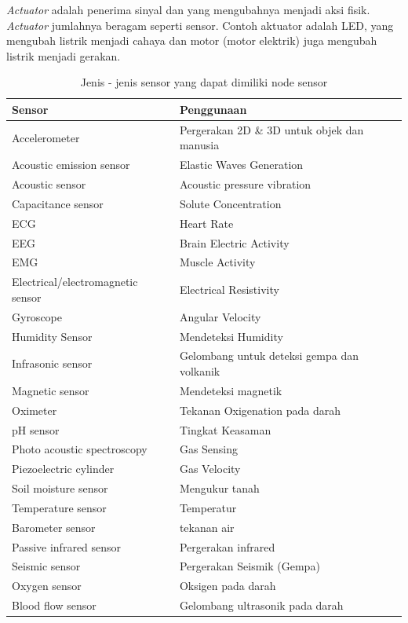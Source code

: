 \documentclass[a4paper,twoside]{article}
\begin{document}
\begin{enumerate}
\begin{itemize}
\begin{itemize}
\textit{Actuator} adalah penerima sinyal dan yang mengubahnya menjadi aksi fisik. \textit{Actuator} jumlahnya beragam seperti sensor.  Contoh aktuator adalah LED, yang mengubah listrik menjadi cahaya dan motor (motor elektrik) juga mengubah listrik menjadi gerakan.

\begin{table} [H]
	\centering 
	\caption{Jenis - jenis sensor yang dapat dimiliki node sensor}
	\label{tab:sensor}
	\begin{tabular}{|p{6cm}|p{9cm}|}
		\toprule
		Sensor & Penggunaan\\

		\midrule
		Accelerometer & Pergerakan 2D \& 3D untuk objek dan manusia  \\
		Acoustic emission sensor & Elastic Waves Generation\\
		Acoustic sensor   & Acoustic pressure vibration\\
		Capacitance sensor  & Solute Concentration\\
		ECG   & Heart Rate\\
		EEG  & Brain Electric Activity\\
		EMG   & Muscle Activity\\
		Electrical/electromagnetic sensor & Electrical Resistivity\\
		Gyroscope  & Angular Velocity \\
		Humidity Sensor   & Mendeteksi Humidity\\
		Infrasonic sensor  &  Gelombang untuk deteksi gempa dan volkanik\\
		Magnetic sensor   & Mendeteksi magnetik\\
		Oximeter   & Tekanan Oxigenation pada darah  \\
		pH sensor  & Tingkat Keasaman\\
		Photo acoustic spectroscopy   & Gas Sensing\\
		Piezoelectric cylinder    &  Gas Velocity\\
		Soil moisture sensor   &  Mengukur tanah\\
		Temperature sensor   & Temperatur \\
		Barometer sensor  &  tekanan air\\
		Passive infrared sensor  & Pergerakan infrared\\
		Seismic sensor   & Pergerakan Seismik (Gempa) \\
		Oxygen sensor  & Oksigen pada darah \\
		Blood flow sensor  & Gelombang ultrasonik pada darah \\


\end{tabular}
\end{table}
\end{itemize}
\end{itemize}
\end{enumerate}
\end{document}
